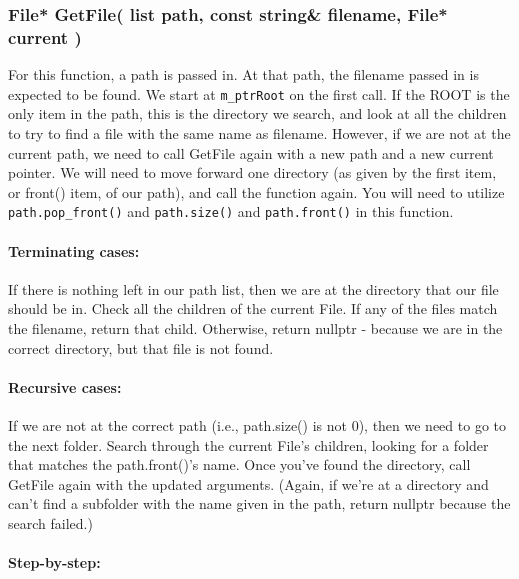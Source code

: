 \documentclass[a4paper,12pt,oneside]{book}
\begin{document}
\hrulefill

\subsubsection{ File* GetFile( list path, const string\& filename, File* current ) }

For this function, a path is passed in. At that path, the filename passed
in is expected to be found. We start at \texttt{m\_ptrRoot} on the first call.
If the ROOT is the only item in the path, this is the directory we search,
and look at all the children to try to find a file with the same name as filename.
However, if we are not at the current path, we need to call GetFile again with a new path and a new current pointer. We will need to move forward one directory (as given by the first item, or front() item, of our path), and call the function again.
You will need to utilize \texttt{path.pop\_front()} and
\texttt{path.size()} and \texttt{path.front()} in this function.


\paragraph{Terminating cases:}

If there is nothing left in our path list, then we are at the directory that our file should be in.
Check all the children of the current File. If any of the files match the filename, return that child. Otherwise, return nullptr - because we are in the correct directory, but that file is not found.

\paragraph{Recursive cases:}

If we are not at the correct path (i.e., path.size() is not 0), then we need to go to the next folder.
Search through the current File's children, looking for a folder that matches the path.front()'s name. Once you've found the directory, call GetFile again with the updated arguments.
(Again, if we're at a directory and can't find a subfolder with the name given in the path, return nullptr because the search failed.)

\paragraph{Step-by-step:}
\end{document}
